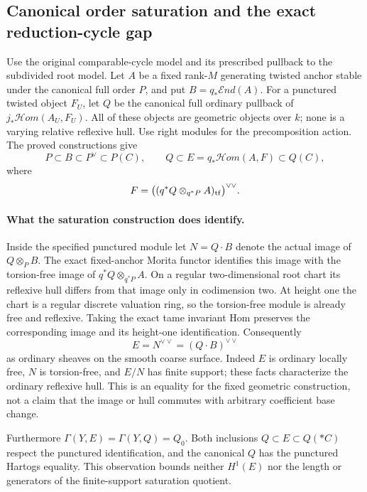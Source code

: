 \subsection*{Canonical order saturation and the exact reduction-cycle gap}

Use the original comparable-cycle model and its prescribed pullback to
the subdivided root model. Let $A$ be a fixed rank-$M$ generating twisted
anchor stable under the canonical full order $P$, and put
$B=q_*\mathcal End(A)$. For a punctured twisted object $F_U$, let
$Q$ be the canonical full ordinary pullback of
$j_*\mathcal Hom(A_U,F_U)$. All of these objects are geometric objects
over $k$; none is a varying relative reflexive hull. Use right modules
for the precomposition action. The proved constructions give
\[
 P\subset B\subset P^\vee\subset P(C),\qquad
 Q\subset E=q_*\mathcal Hom(A,F)\subset Q(C),
\]
where
\[
 F=\bigl((q^*Q\otimes_{q^*P}A)_{\rm tf}\bigr)^{\vee\vee}.
\]

\paragraph{What the saturation construction does identify.}
Inside the specified punctured module let $N=Q\cdot B$ denote the
actual image of $Q\otimes_P B$. The exact fixed-anchor Morita functor
identifies this image with the torsion-free image of
$q^*Q\otimes_{q^*P}A$. On a regular two-dimensional root chart its
reflexive hull differs from that image only in codimension two.
At height one the chart is a regular discrete valuation ring, so the
torsion-free module is already free and reflexive. Taking the exact
tame invariant Hom preserves the corresponding image and its
height-one identification. Consequently
\[
                     E=N^{\vee\vee}=(Q\cdot B)^{\vee\vee}
\]
as ordinary sheaves on the smooth coarse surface. Indeed $E$ is
ordinary locally free, $N$ is torsion-free, and $E/N$ has finite
support; these facts characterize the ordinary reflexive hull.
This is an equality for the fixed geometric construction, not a
claim that the image or hull commutes with arbitrary coefficient
base change.

Furthermore $\Gamma(Y,E)=\Gamma(Y,Q)=Q_0$. Both inclusions
$Q\subset E\subset Q(*C)$ respect the punctured identification,
and the canonical $Q$ has the punctured Hartogs equality. This
observation bounds neither $H^1(E)$ nor the length or generators
of the finite-support saturation quotient.

